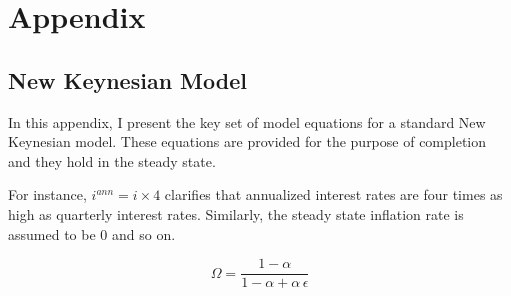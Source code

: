 \documentclass[12pt]{article}
\newcommand{\1}{\mathbbm 1}
\begin{document}
		
		
		
		
		
		
		
		
		
		
		
		
		\newpage
		
		
		
		
		
		\section{Appendix}
		
		
		
		
	
	\subsection{New Keynesian Model}
	
	In this appendix, I present the key set of model equations for a standard New Keynesian model. These equations are provided for the purpose of completion and they hold in the steady state.
	
	For instance, $i^{ann} = i \times 4$ clarifies that annualized interest rates are four times as high as quarterly interest rates. Similarly, the steady state inflation rate is assumed to be $0$ and so on.
	
	\begin{equation*}
		\Omega = \frac{1-{{\alpha}}}{1-{{\alpha}}+{{\alpha}}\, {{\epsilon}}}
	\end{equation*}
\end{document}

